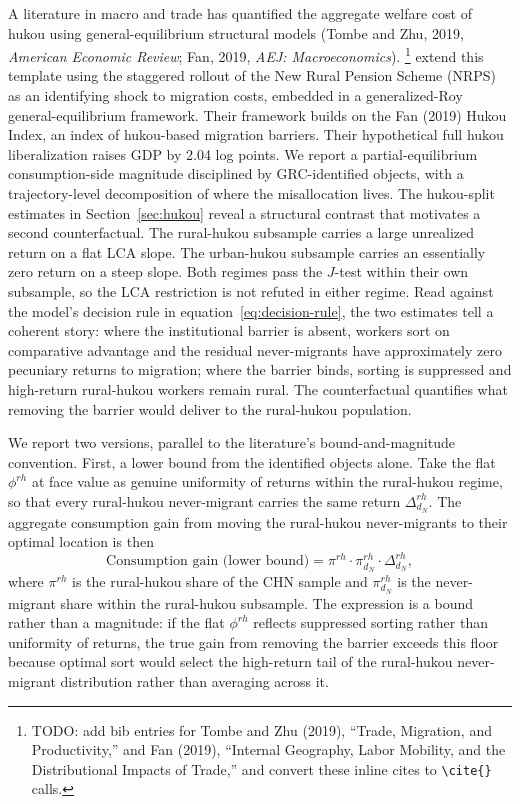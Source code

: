 A literature in macro and trade has quantified the aggregate welfare cost of hukou using general-equilibrium structural models (Tombe and Zhu, 2019, \emph{American Economic Review}; Fan, 2019, \emph{AEJ: Macroeconomics}).%
\footnote{TODO: add bib entries for Tombe and Zhu (2019), ``Trade, Migration, and Productivity,'' and Fan (2019), ``Internal Geography, Labor Mobility, and the Distributional Impacts of Trade,'' and convert these inline cites to \texttt{\textbackslash cite\{\}} calls.}
\cite{gaiRuralPensionsLabor2025} extend this template using the staggered rollout of the New Rural Pension Scheme (NRPS) as an identifying shock to migration costs, embedded in a generalized-Roy general-equilibrium framework.
Their framework builds on the Fan (2019) Hukou Index, an index of hukou-based migration barriers.
Their hypothetical full hukou liberalization raises GDP by 2.04 log points.
We report a partial-equilibrium consumption-side magnitude disciplined by GRC-identified objects, with a trajectory-level decomposition of where the misallocation lives.
The hukou-split estimates in Section~\ref{sec:hukou} reveal a structural contrast that motivates a second counterfactual.
The rural-hukou subsample carries a large unrealized return on a flat LCA slope.
The urban-hukou subsample carries an essentially zero return on a steep slope.
Both regimes pass the $J$-test within their own subsample, so the LCA restriction is not refuted in either regime.
Read against the model's decision rule in equation~\eqref{eq:decision-rule}, the two estimates tell a coherent story: where the institutional barrier is absent, workers sort on comparative advantage and the residual never-migrants have approximately zero pecuniary returns to migration; where the barrier binds, sorting is suppressed and high-return rural-hukou workers remain rural.
The counterfactual quantifies what removing the barrier would deliver to the rural-hukou population.

We report two versions, parallel to the literature's bound-and-magnitude convention.
First, a lower bound from the identified objects alone.
Take the flat $\phi^{rh}$ at face value as genuine uniformity of returns within the rural-hukou regime, so that every rural-hukou never-migrant carries the same return $\Delta_{d_N}^{rh}$.
The aggregate consumption gain from moving the rural-hukou never-migrants to their optimal location is then
\begin{equation}\label{eq:hukou-bound}
    \text{Consumption gain (lower bound)} = \pi^{rh} \cdot \pi_{d_N}^{rh} \cdot \Delta_{d_N}^{rh},
\end{equation}
where $\pi^{rh}$ is the rural-hukou share of the CHN sample and $\pi_{d_N}^{rh}$ is the never-migrant share within the rural-hukou subsample.
The expression is a bound rather than a magnitude: if the flat $\phi^{rh}$ reflects suppressed sorting rather than uniformity of returns, the true gain from removing the barrier exceeds this floor because optimal sort would select the high-return tail of the rural-hukou never-migrant distribution rather than averaging across it.


